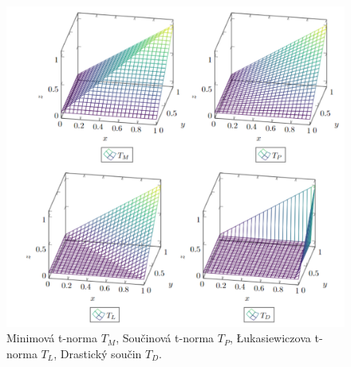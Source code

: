    \begin{figure}[H]
   \caption{ Minimová t-norma $T_M$, Součinová t-norma $T_P$, Łukasiewiczova t-norma $T_L$, Drastický součin $T_D$.}
    \hspace{-1cm}
        \includegraphics[scale=0.65]{template-fig/t_normy.pdf}
        \centering
    \end{figure}


